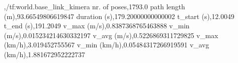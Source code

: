 ,/tf:world.base_link_kimera
nr. of poses,1793.0
path length (m),93.66549806619847
duration (s),179.20000000000002
t_start (s),12.0049
t_end (s),191.2049
v_max (m/s),0.8387368765463888
v_min (m/s),0.015234214630332197
v_avg (m/s),0.5226869311729825
v_max (km/h),3.019452755567
v_min (km/h),0.05484317266919591
v_avg (km/h),1.881672952222737
